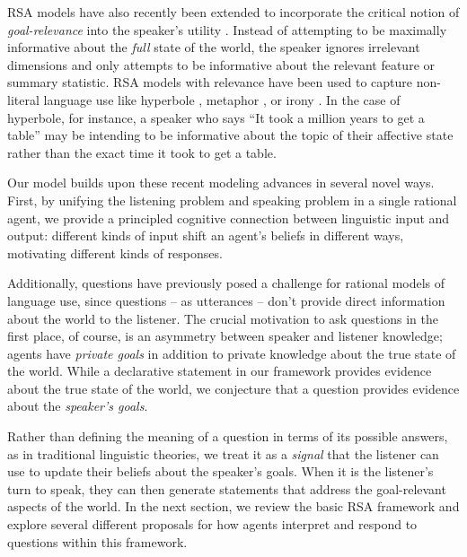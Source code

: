 \documentclass[12pt, floatsintext, jou]{apa6}
\begin{document}
RSA models have also recently been extended to incorporate the critical notion of \emph{goal-relevance} into the speaker's utility \cite{Roberts96_InformationStructureDiscourse, WilsonSperber12_MeaningRelevance}. Instead of attempting to be maximally informative about the \emph{full} state of the world, the speaker ignores irrelevant dimensions and only attempts to be informative about the relevant feature or summary statistic. RSA models with relevance have been used to capture non-literal language use like hyperbole \cite{KaoWuBergenGoodman14_NonliteralNumberWords}, metaphor \cite{KaoEtAl2014-Cogsci}, or irony \cite{KaoGoodman15_IronyCogSci}. In the case of hyperbole, for instance, a speaker who says ``It took a million years to get a table'' may be intending to be informative about the topic of their affective state rather than the exact time it took to get a table. 

Our model builds upon these recent modeling advances in several novel ways. 
First, by unifying the listening problem and speaking problem in a single rational agent, we provide a principled cognitive connection between linguistic input and output: different kinds of input shift an agent's beliefs in different ways, motivating different kinds of responses. 

Additionally, questions have previously posed a challenge for rational models of language use, since questions -- as utterances -- don't provide direct information about the world to the listener.
The crucial motivation to ask questions in the first place, of course, is an asymmetry between speaker and listener knowledge; agents have \emph{private goals} in addition to private knowledge about the true state of the world. 
While a declarative statement in our framework provides evidence about the true state of the world, we conjecture that a question provides evidence about the \emph{speaker's goals}. 

Rather than defining the meaning of a question in terms of its possible answers, as in traditional linguistic theories, we treat it as a \emph{signal} that the listener can use to update their beliefs about the speaker's goals. 
When it is the listener's turn to speak, they can then generate statements that address the goal-relevant aspects of the world. In the next section, we review the basic RSA framework and explore several different proposals for how agents interpret and respond to questions within this framework.
\end{document}
